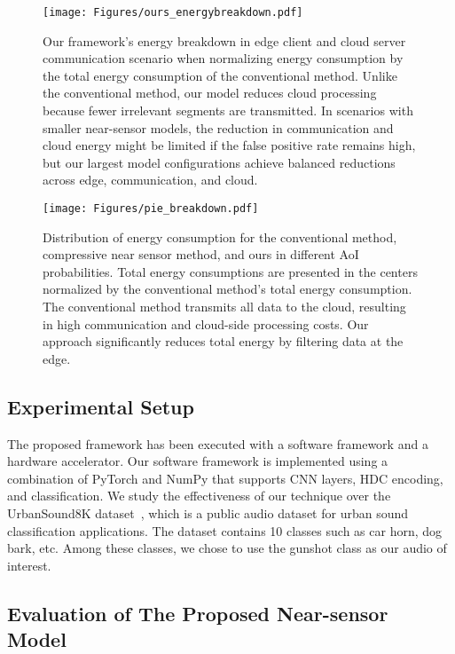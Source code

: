 

\begin{figure*}[t!]
    \centering    \texttt{[image: Figures/ours\_energybreakdown.pdf]}
    \caption{Our framework's energy breakdown in edge client and cloud server communication scenario when normalizing energy consumption by the total energy consumption of the conventional method. Unlike the conventional method, our model reduces cloud processing because fewer irrelevant segments are transmitted. In scenarios with smaller near-sensor models, the reduction in communication and cloud energy might be limited if the false positive rate remains high, but our largest model configurations achieve balanced reductions across edge, communication, and cloud.}
    \label{fig:ours_energybreakdown}
\end{figure*}

\begin{figure*}[t!]
    \centering    \texttt{[image: Figures/pie\_breakdown.pdf]}
    \caption{Distribution of energy consumption for the conventional method, compressive near sensor method, and ours in different AoI probabilities. Total energy consumptions are presented in the centers normalized by the conventional method's total energy consumption. The conventional method transmits all data to the cloud, resulting in high communication and cloud-side processing costs. Our approach significantly reduces total energy by filtering data at the edge.}
    \label{fig:pie_breakdown}
\end{figure*}

\subsection{Experimental Setup}
The proposed framework has been executed with a software framework and a hardware accelerator. Our software framework is implemented using a combination of PyTorch and NumPy that supports CNN layers, HDC encoding, and classification. We study the effectiveness of our technique over the UrbanSound8K dataset~\cite{salamon2014dataset}, which is a public audio dataset for urban sound classification applications. The dataset contains 10 classes such as car horn, dog bark, etc. Among these classes, we chose to use the gunshot class as our audio of interest.

\subsection{Evaluation of The Proposed Near-sensor Model}

